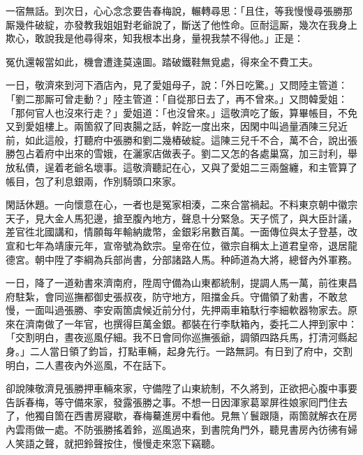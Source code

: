一宿無話。到次日，心心念念要告春梅說，輾轉尋思：「且住，等我慢慢尋張勝那厮幾件破綻，亦發教我姐姐對老爺說了，斷送了他性命。{}叵耐這厮，幾次在我身上欺心，敢說我是他尋得來，知我根本出身，量視我禁不得他。」正是：

冤仇還報當如此，機會遭逢莫遠圖。踏破鐵鞋無覓處，得來全不費工夫。

一日，敬濟來到河下酒店內，見了愛姐母子，說：「外日吃驚。」又問陸主管道：「劉二那厮可曾走動？」陸主管道：「自從那日去了，再不曾來。」又問韓愛姐：「那何官人也沒來行走？」愛姐道：「也沒曾來。」這敬濟吃了飯，算畢帳目，不免又到愛姐樓上。兩箇叙了囘衷腸之話，幹訖一度出來，因閑中叫過量酒陳三兒近前，如此這般，打聽府中張勝和劉二幾樁破綻。這陳三兒千不合，萬不合，說出張勝包占着府中出來的雪娥，在灑家店做表子。劉二又怎的各處巢窩，加三討利，舉放私債，逞着老爺名壞事。{}這敬濟聽記在心，又與了愛姐二三兩盤纏，和主管算了帳目，包了利息銀兩，作別騎頭口來家。

閑話休題。一向懷意在心，一者也是冤家相湊，二來合當禍起。不料東京朝中徽宗天子，見大金人馬犯邊，搶至腹內地方，聲息十分緊急。天子慌了，與大臣計議，差官徃北國講和，情願每年輸納歲幣，金銀彩帛數百萬。一面傳位與太子登基，改宣和七年為靖康元年，宣帝號為欽宗。皇帝在位，徽宗自稱太上道君皇帝，退居龍德宮。朝中陞了李綱為兵部尚書，分部諸路人馬。种師道為大將，總督內外軍務。

一日，降了一道勑書來濟南府，陞周守備為山東都統制，提調人馬一萬，前徃東昌府駐紮，會同巡撫都御史張叔夜，防守地方，阻擋金兵。守備領了勑書，不敢怠慢，一面叫過張勝、李安兩箇虞候近前分付，先押兩車箱馱行李細軟器物家去。原來在濟南做了一年官，也撰得巨萬金銀。都裝在行李馱箱內，委托二人押到家中：「交割明白，晝夜巡風仔細。我不日會同你巡撫張爺，調領四路兵馬，打清河縣起身。」二人當日領了鈞旨，打點車輛，起身先行。一路無詞。有日到了府中，交割明白，二人晝夜內外巡風，不在話下。

卻說陳敬濟見張勝押車輛來家，守備陞了山東統制，不久將到，正欲把心腹中事要告訴春梅，等守備來家，發露張勝之事。不想一日因渾家葛翠屏徃娘家囘門住去了，他獨自箇在西書房寢歇，春梅驀進房中看他。見無丫鬟跟隨，兩箇就解衣在房內雲雨做一處。不防張勝搖着鈴，巡風過來，{}到書院角門外，聽見書房內彷彿有婦人笑語之聲，就把鈴聲按住，慢慢走來窓下竊聽。

